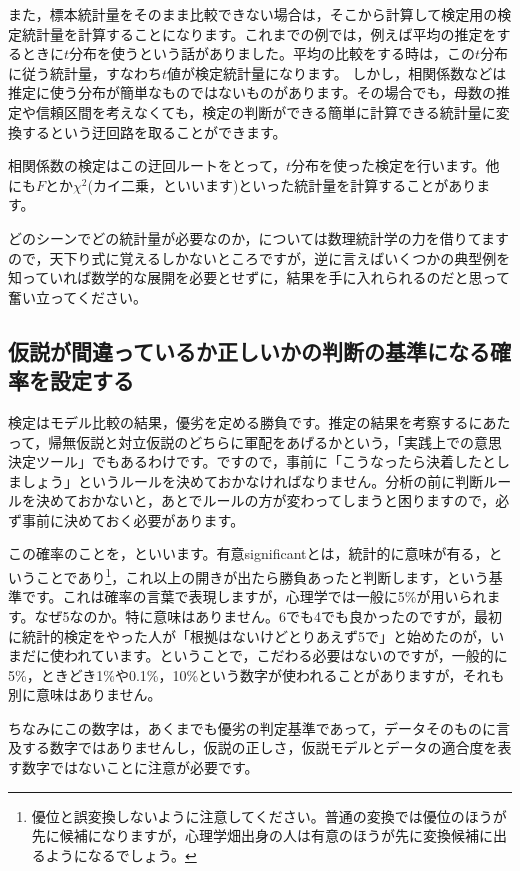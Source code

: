 \documentclass{ltjsbook}
\begin{document}
また，標本統計量をそのまま比較できない場合は，そこから計算して検定用の検定統計量を計算することになります。これまでの例では，例えば平均の推定をするときに$t$分布を使うという話がありました。平均の比較をする時は，この$t$分布に従う統計量，すなわち$t$値が検定統計量になります。
しかし，相関係数などは推定に使う分布が簡単なものではないものがあります。その場合でも，母数の推定や信頼区間を考えなくても，検定の判断ができる簡単に計算できる統計量に変換するという迂回路を取ることができます。

相関係数の検定はこの迂回ルートをとって，$t$分布を使った検定を行います。他にも$F$とか$\chi^2$(カイ二乗，といいます)といった統計量を計算することがあります。

どのシーンでどの統計量が必要なのか，については数理統計学の力を借りてますので，天下り式に覚えるしかないところですが，逆に言えばいくつかの典型例を知っていれば数学的な展開を必要とせずに，結果を手に入れられるのだと思って奮い立ってください。

\subsection{仮説が間違っているか正しいかの判断の基準になる確率を設定する}
\label{ModelComparison2}
検定はモデル比較の結果，優劣を定める勝負です。推定の結果を考察するにあたって，帰無仮説と対立仮説のどちらに軍配をあげるかという，「実践上での意思決定ツール」でもあるわけです。ですので，事前に「こうなったら決着したとしましょう」というルールを決めておかなければなりません。分析の前に判断ルールを決めておかないと，あとでルールの方が変わってしまうと困りますので，必ず事前に決めておく必要があります。

この確率のことを，といいます。有意significantとは，統計的に意味が有る，ということであり\footnote{優位と誤変換しないように注意してください。普通の変換では優位のほうが先に候補になりますが，心理学畑出身の人は有意のほうが先に変換候補に出るようになるでしょう。}，これ以上の開きが出たら勝負あったと判断します，という基準です。これは確率の言葉で表現しますが，心理学では一般に5\%が用いられます。なぜ5なのか。特に意味はありません。6でも4でも良かったのですが，最初に統計的検定をやった人が「根拠はないけどとりあえず5で」と始めたのが，いまだに使われています。ということで，こだわる必要はないのですが，一般的に5\%，ときどき1\%や0.1\%，10\%という数字が使われることがありますが，それも別に意味はありません。

ちなみにこの数字は，あくまでも優劣の判定基準であって，データそのものに言及する数字ではありませんし，仮説の正しさ，仮説モデルとデータの適合度を表す数字ではないことに注意が必要です。
\end{document}
